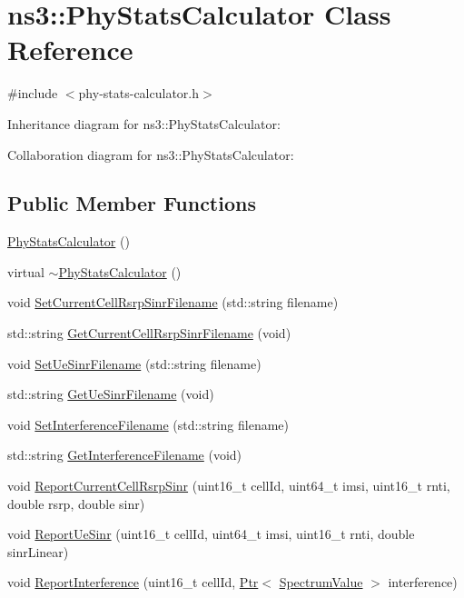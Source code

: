 \hypertarget{classns3_1_1PhyStatsCalculator}{}\section{ns3\+:\+:Phy\+Stats\+Calculator Class Reference}
\label{classns3_1_1PhyStatsCalculator}


{\ttfamily \#include $<$phy-\/stats-\/calculator.\+h$>$}



Inheritance diagram for ns3\+:\+:Phy\+Stats\+Calculator\+:


Collaboration diagram for ns3\+:\+:Phy\+Stats\+Calculator\+:
\subsection*{Public Member Functions}
\begin{DoxyCompactItemize}
\item 
\hyperlink{classns3_1_1PhyStatsCalculator_a6dde48a5df609ffc909e3825e53b0e30}{Phy\+Stats\+Calculator} ()
\item 
virtual \hyperlink{classns3_1_1PhyStatsCalculator_a51c9fd5795e6a1d3f196e5914afcfc59}{$\sim$\+Phy\+Stats\+Calculator} ()
\item 
void \hyperlink{classns3_1_1PhyStatsCalculator_a554e051adef52b9c52fe3832166dbb71}{Set\+Current\+Cell\+Rsrp\+Sinr\+Filename} (std\+::string filename)
\item 
std\+::string \hyperlink{classns3_1_1PhyStatsCalculator_af7de84c2e08f8c9af752fae05968bba8}{Get\+Current\+Cell\+Rsrp\+Sinr\+Filename} (void)
\item 
void \hyperlink{classns3_1_1PhyStatsCalculator_a7af5e5c196db507c1aa80c807146072c}{Set\+Ue\+Sinr\+Filename} (std\+::string filename)
\item 
std\+::string \hyperlink{classns3_1_1PhyStatsCalculator_a2a7d8dc8a4658c449b4e486ffd5ad642}{Get\+Ue\+Sinr\+Filename} (void)
\item 
void \hyperlink{classns3_1_1PhyStatsCalculator_a2b07294a3e5f7c8a239b06ccb1bf2529}{Set\+Interference\+Filename} (std\+::string filename)
\item 
std\+::string \hyperlink{classns3_1_1PhyStatsCalculator_a8652cf470bf699be1ebe2f16a4dfd781}{Get\+Interference\+Filename} (void)
\item 
void \hyperlink{classns3_1_1PhyStatsCalculator_a50b42f8dfe46fb6816e8613174567cb6}{Report\+Current\+Cell\+Rsrp\+Sinr} (uint16\+\_\+t cell\+Id, uint64\+\_\+t imsi, uint16\+\_\+t rnti, double rsrp, double sinr)
\item 
void \hyperlink{classns3_1_1PhyStatsCalculator_affac4e69f2edac1880494cd751166b25}{Report\+Ue\+Sinr} (uint16\+\_\+t cell\+Id, uint64\+\_\+t imsi, uint16\+\_\+t rnti, double sinr\+Linear)
\item 
void \hyperlink{classns3_1_1PhyStatsCalculator_aed49d3eb68d3322e3f8fd94f884a4d9f}{Report\+Interference} (uint16\+\_\+t cell\+Id, \hyperlink{classns3_1_1Ptr}{Ptr}$<$ \hyperlink{classns3_1_1SpectrumValue}{Spectrum\+Value} $>$ interference)
\end{DoxyCompactItemize}
